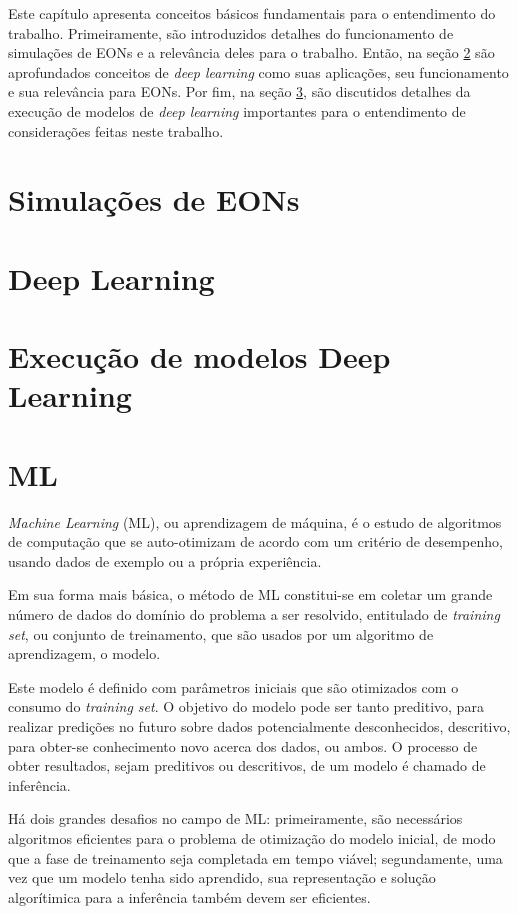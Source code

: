 Este capítulo apresenta conceitos básicos fundamentais para o entendimento do trabalho. Primeiramente, são introduzidos detalhes do funcionamento de simulações de EONs e a relevância deles para o trabalho. Então, na seção \ref{ft_dl} são aprofundados conceitos de \textit{deep learning} como suas aplicações, seu funcionamento e sua relevância para EONs. Por fim, na seção \ref{ft_dl_run}, são discutidos detalhes da execução de modelos de \textit{deep learning} importantes para o entendimento de considerações feitas neste trabalho.

\section{Simulações de EONs}%
\label{ft_eon}

\section{Deep Learning}%
\label{ft_dl}

\section{Execução de modelos Deep Learning}%
\label{ft_dl_run}

\section{ML}

\textit{Machine Learning} (ML), ou aprendizagem de máquina, é o estudo de algoritmos de computação que se auto-otimizam de acordo com um critério de desempenho, usando dados de exemplo ou a própria experiência. \cite{mitchell1997ml} \cite{alpaydin2020introduction}

Em sua forma mais básica, o método de ML constitui-se em coletar um grande número de dados do domínio do problema a ser resolvido, entitulado de \textit{training set}, ou conjunto de treinamento, que são usados por um algoritmo de aprendizagem, o modelo.

Este modelo é definido com parâmetros iniciais que são otimizados com o consumo do \textit{training set}. O objetivo do modelo pode ser tanto preditivo, para realizar predições no futuro sobre dados potencialmente desconhecidos, descritivo, para obter-se conhecimento novo acerca dos dados, ou ambos. O processo de obter resultados, sejam preditivos ou descritivos, de um modelo é chamado de inferência.

Há dois grandes desafios no campo de ML: primeiramente, são necessários algoritmos eficientes para o problema de otimização do modelo inicial, de modo que a fase de treinamento seja completada em tempo viável; segundamente, uma vez que um modelo tenha sido aprendido, sua representação e solução algorítimica para a inferência também devem ser eficientes. \cite{alpaydin2020introduction} \cite{brief_introduction_to_ml}

